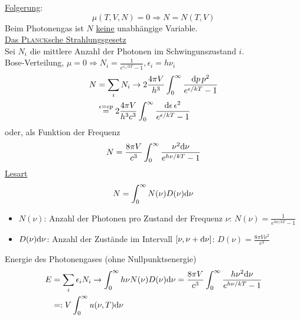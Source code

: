 \begin{enumerate}[A)]
    \underline{Folgerung}:
    \begin{equation}
        \mu(T, V, N) = 0 \Rightarrow N = N(T, V)
    \end{equation}
    Beim Photonengas ist $N$ \underline{keine} unabhängige Variable. \\
    \underline{Das \textsc{Planck}sche Strahlungsgesetz}\\
    Sei $N_i$ die mittlere Anzahl der Photonen im Schwingunszustand $i$. \\
    Bose-Verteilung, $\mu = 0 \Rightarrow N_i = \frac{1}{e^{\epsilon_i / k T} - 1}, \epsilon_i = h \nu_i$
    \begin{equation}
        \begin{split}
            N &= \sum_i N_i \rightarrow 2 \frac{4 \pi V}{h^3} \int_0^\infty \frac{\mathrm{d} p \, p^2}{e^{\epsilon / k T} - 1} \\
            &\overset{\epsilon = c p}{=} 2 \frac{4 \pi V}{h^3 c^3} \int_0^\infty \frac{\mathrm{d} \epsilon \, \epsilon^2}{e^{\epsilon / k T} - 1}
        \end{split}
    \end{equation}
    oder, als Funktion der Frequenz
    \begin{equation}
        N = \frac{8 \pi V}{c^3} \int_0^\infty \frac{\nu^2 \mathrm{d} \nu}{e^{h \nu / k T} - 1}
    \end{equation}
    \underline{Lesart} 
    \begin{equation}
    N = \int_0^\infty N(\nu) D(\nu) \mathrm{d} \nu
    \end{equation}
    \begin{itemize}
        \item $N(\nu)$: Anzahl der Photonen pro Zustand der Frequenz $\nu$: $N(\nu) = \frac{1}{e^{h \nu / k T} - 1}$
        \item $D(\nu)\mathrm{d} \nu$: Anzahl der Zustände im Intervall $[\nu, \nu + \mathrm{d} \nu]$: $D(\nu) = \frac{8 \pi V \nu^2}{c^3}$
    \end{itemize}
    Energie des Photonengases (ohne Nullpunktsenergie)
    \begin{equation}
        \begin{split}
            E &= \sum_i \epsilon_i N_i \rightarrow \int_0^\infty h \nu N(\nu) D(\nu) \mathrm{d} \nu = \frac{8 \pi V}{c^3} \int_0^\infty \frac{h \nu^2 \mathrm{d} \nu}{e^{h \nu / k T} - 1} \\
            &=: V \int_0^\infty u(\nu, T) \mathrm{d} \nu
        \end{split}
    \end{equation}

\end{enumerate}

